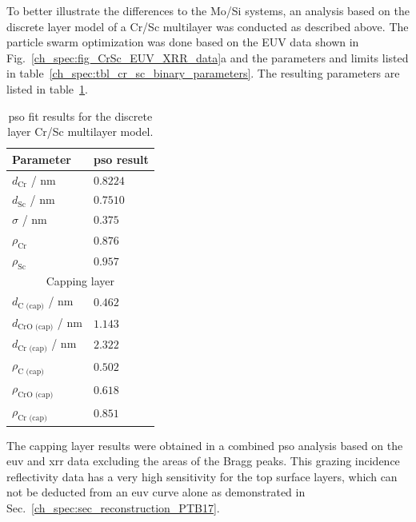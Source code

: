 To better illustrate the differences to the Mo/Si systems, an 
analysis based on the discrete layer model of a Cr/Sc multilayer was conducted as described above. The particle swarm optimization was done based on the EUV data shown in Fig.~\ref{ch_spec:fig_CrSc_EUV_XRR_data}a and the parameters and limits listed in table~\ref{ch_spec:tbl_cr_sc_binary_parameters}. The resulting parameters are listed in table~\ref{ch_spec:tbl_cr_sc_binary_pso_results}.
\begin{table}[htbp]
\centering
\caption{\gls{pso} fit results for the discrete layer Cr/Sc multilayer model.}
\label{ch_spec:tbl_cr_sc_binary_pso_results}
\begin{tabular}{@{}ll@{}}
\toprule
Parameter &  \gls{pso} result\\ \midrule
$d_\text{Cr}$ / nm &  $0.8224$\\ 
$d_\text{Sc}$ / nm &  $0.7510$\\ 
$\sigma$ / nm &  $0.375$\\ 
$\rho_\text{Cr}$  & $0.876$\\ 
$\rho_\text{Sc}$ & $0.957$\\ 
\midrule
\multicolumn{2}{c}{Capping layer}\\
\midrule
$d_\text{C (cap)}$ / nm  & $0.462$ \\ 
$d_\text{CrO (cap)}$ / nm  & $1.143$ \\ 
$d_\text{Cr (cap)}$ / nm  & $2.322$ \\ 
$\rho_\text{C (cap)}$ & $0.502$\\ 
$\rho_\text{CrO (cap)}$& $0.618$\\
$\rho_\text{Cr (cap)}$ & $0.851$\\
 \bottomrule
\end{tabular}
\end{table}
The capping layer results were obtained in a combined \gls{pso} analysis based on the \gls{euv} and \gls{xrr} data excluding the areas of the Bragg peaks. This grazing incidence reflectivity data has a very high sensitivity for the top surface layers, which can not be deducted from an \gls{euv} curve alone as demonstrated in Sec.~\ref{ch_spec:sec_reconstruction_PTB17}.

